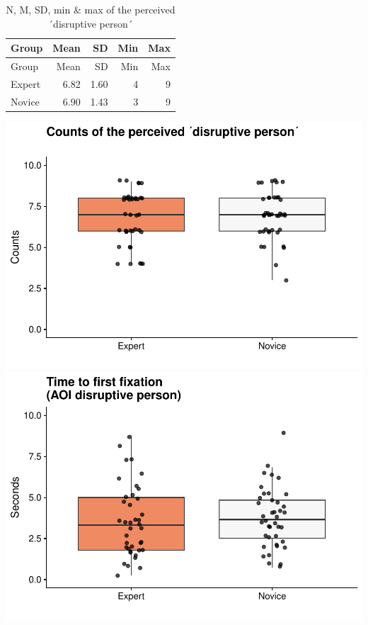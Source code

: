 \documentclass[
]{article}
\begin{document}
\begin{longtable}[]{@{}lrrrr@{}}
\caption{N, M, SD, min \& max of the perceived ´disruptive
person´}\tabularnewline
\toprule\noalign{}
Group & Mean & SD & Min & Max \\
\midrule\noalign{}
\endfirsthead
\toprule\noalign{}
Group & Mean & SD & Min & Max \\
\midrule\noalign{}
\endhead
\bottomrule\noalign{}
\endlastfoot
Expert & 6.82 & 1.60 & 4 & 9 \\
Novice & 6.90 & 1.43 & 3 & 9 \\
\end{longtable}

\includegraphics{expertise_2024_09_26_no_outlierdetection_MK_files/figure-latex/ttff_disrup-1.pdf}
\includegraphics{expertise_2024_09_26_no_outlierdetection_MK_files/figure-latex/ttff_disrup-2.pdf}
\end{document}
